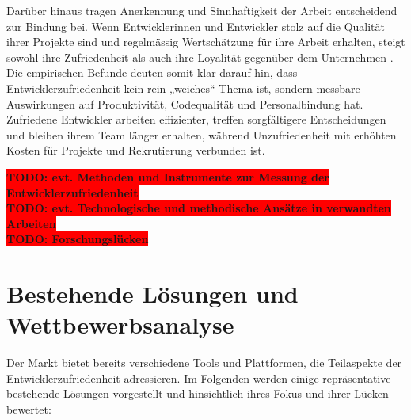\documentclass[12pt,a4paper]{report}
\newcommand{\todo}[1]{\colorbox{red}{\textbf{TODO: #1}}\\}
\begin{document}
Darüber hinaus tragen Anerkennung und Sinnhaftigkeit der Arbeit entscheidend zur Bindung bei. Wenn Entwicklerinnen und Entwickler
stolz auf die Qualität ihrer Projekte sind und regelmässig Wertschätzung für ihre Arbeit erhalten, steigt sowohl ihre Zufriedenheit
als auch ihre Loyalität gegenüber dem Unternehmen \cite{sadowski_happiness_2019,graziotin_what_2018}. Die empirischen Befunde deuten
somit klar darauf hin, dass Entwicklerzufriedenheit kein rein „weiches“ Thema ist, sondern messbare Auswirkungen auf Produktivität,
Codequalität und Personalbindung hat. Zufriedene Entwickler arbeiten effizienter, treffen sorgfältigere Entscheidungen und bleiben
ihrem Team länger erhalten, während Unzufriedenheit mit erhöhten Kosten für Projekte und Rekrutierung verbunden ist.

\todo{evt. Methoden und Instrumente zur Messung der Entwicklerzufriedenheit}
\todo{evt. Technologische und methodische Ansätze in verwandten Arbeiten}
\todo{Forschungslücken}

\section{Bestehende Lösungen und Wettbewerbsanalyse}

Der Markt bietet bereits verschiedene Tools und Plattformen, die Teilaspekte der Entwicklerzufriedenheit adressieren. Im Folgenden
werden einige repräsentative bestehende Lösungen vorgestellt und hinsichtlich ihres Fokus und ihrer Lücken bewertet:
\end{document}
